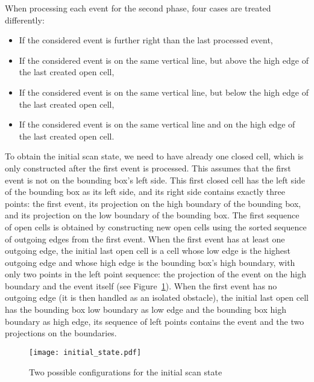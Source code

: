 \documentclass[a4paper, USenglish, cleveref, autoref, thm-restate, final]{lipics-v2021}
\begin{document}
When processing each event for the second phase,
four cases are treated differently:
\begin{itemize}
\item If the considered event is further right than the last processed event,
\item If the considered event is on the same vertical line, but above the
high edge of the last created open cell,
\item If the considered event is on the same vertical line, but below the
high edge of the last created open cell,
\item If the considered event is on the same vertical line and on the
  high edge of the last created open cell.
\end{itemize}

To obtain the initial scan state, we need to have already one closed
cell, which is only constructed after the first event is processed.
This assumes that the first event is not on the bounding box's left side.
This first closed cell has the left side of the bounding box as its left
side, and its right side contains exactly three points: the first
event, its projection on the high boundary of the bounding box, and its
projection on the low boundary of the bounding box.  The first
sequence of open cells is obtained by constructing new open cells
using the sorted sequence of outgoing edges from the first event.
When the first event has at least
one outgoing edge, the initial last open cell is a cell whose low edge
is the highest outgoing edge and whose high edge is the bounding box's
high boundary, with only two points in the left point sequence: the
projection of the event on the high boundary and the event itself (see Figure~\ref{figure:initial}).
When the first event has no outgoing edge (it is then handled as an
isolated obstacle), the initial last open cell
has the bounding box low boundary as low edge and the bounding box
high boundary as high edge, its sequence of left points contains the
event and the two projections on the boundaries.
\begin{figure}
\texttt{[image: initial\_state.pdf]}
\caption{\label{figure:initial}Two possible configurations for the initial scan state}
\end{figure}
\end{document}
